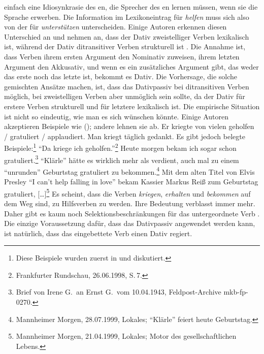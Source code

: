 einfach eine Idiosynkrasie des en, die Sprecher des en lernen müssen, wenn sie die
Sprache erwerben. Die Information im Lexikoneintrag für \emph{helfen} muss sich also von der für
\emph{unterstützen} unterscheiden. Einige Autoren erkennen diesen Unterschied an und nehmen an, dass der Dativ
zweistelliger Verben lexikalisch ist, während der Dativ ditransitiver Verben strukturell ist \citep[, 51]{Wunderlich97a}. Die Annahme ist,
dass Verben ihrem ersten Argument den Nominativ zuweisen, ihrem letzten Argument den Akkusativ, und
wenn es ein zusätzliches Argument gibt, das weder das erste noch das letzte ist, bekommt es Dativ. Die
Vorhersage, die solche gemischten Ansätze machen, ist, dass das Dativpassiv bei
ditransitiven Verben möglich, bei zweistelligen Verben aber unmöglich sein sollte, da der Dativ für erstere
Verben strukturell und für letztere lexikalisch ist. Die empirische Situation ist nicht so eindeutig, wie man es sich
wünschen könnte. Einige Autoren akzeptieren Beispiele wie (); andere lehnen sie ab.
\eal
\label{ex-helfen-with-dative-passive}
\ex 
Er kriegte von vielen geholfen / gratuliert / applaudiert.
\ex 
Man kriegt täglich gedankt.
\zl
Es gibt jedoch belegte Beispiele:\footnote{
  Diese Beispiele wurden zuerst in  und  diskutiert.
}
\eal
\label{ex-helfen-with-dative-passive-corpus}
\ex "`Da kriege ich geholfen."'\footnote{
Frankfurter Rundschau, 26.06.1998, S.\,7.%
}
\ex
Heute morgen bekam ich sogar schon gratuliert.\footnote{%
Brief von Irene G.\ an Ernst G.\ vom 10.04.1943, Feldpost-Archive mkb-fp-0270.}
\ex
"`Klärle"' hätte es wirklich mehr als verdient, auch mal zu einem "`unrunden"' Geburtstag gratuliert zu bekommen.\footnote{
Mannheimer Morgen, 28.07.1999, Lokales; "`Klärle"' feiert heute Geburtstag.%
}
\ex 
Mit dem alten Titel von Elvis Presley "`I can't help falling in love"' bekam Kassier Markus Reiß zum Geburtstag gratuliert, [\ldots]\footnote{
Mannheimer Morgen, 21.04.1999, Lokales; Motor des gesellschaftlichen Lebens.%
}
\zl
Es scheint, dass die Verben \emph{kriegen}, \emph{erhalten} und \emph{bekommen} auf dem Weg sind, zu
Hilfsverben zu werden. Ihre Bedeutung verblasst immer mehr. Daher gibt es kaum noch
Selektionsbeschränkungen für das untergeordnete Verb \citep[Abschnitt~3.1.4]{Mueller2002b}. Die einzige Voraussetzung dafür, dass das Dativpassiv angewendet werden kann, ist
natürlich, dass das eingebettete Verb einen Dativ regiert.

